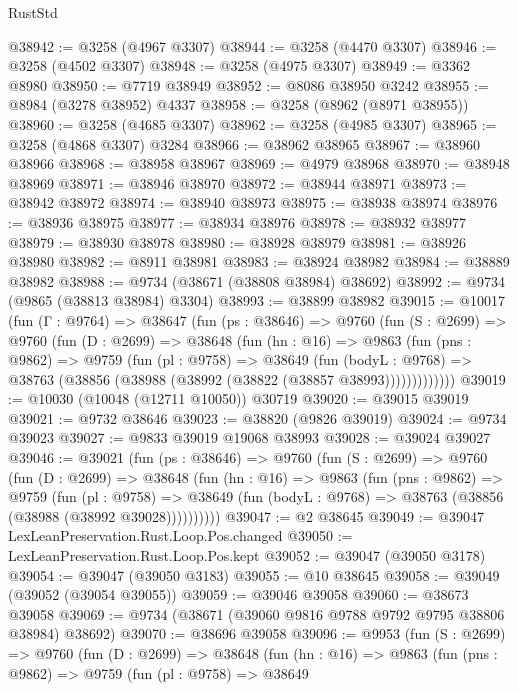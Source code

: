 \begin{lexlean}{RustStd}
\begin{coremodule}
@38942 := @3258 (@4967 @3307)
@38944 := @3258 (@4470 @3307)
@38946 := @3258 (@4502 @3307)
@38948 := @3258 (@4975 @3307)
@38949 := @3362 @8980
@38950 := @7719 @38949
@38952 := @8086 @38950 @3242
@38955 := @8984 (@3278 @38952) @4337
@38958 := @3258 (@8962 (@8971 @38955))
@38960 := @3258 (@4685 @3307)
@38962 := @3258 (@4985 @3307)
@38965 := @3258 (@4868 @3307) @3284
@38966 := @38962 @38965
@38967 := @38960 @38966
@38968 := @38958 @38967
@38969 := @4979 @38968
@38970 := @38948 @38969
@38971 := @38946 @38970
@38972 := @38944 @38971
@38973 := @38942 @38972
@38974 := @38940 @38973
@38975 := @38938 @38974
@38976 := @38936 @38975
@38977 := @38934 @38976
@38978 := @38932 @38977
@38979 := @38930 @38978
@38980 := @38928 @38979
@38981 := @38926 @38980
@38982 := @8911 @38981
@38983 := @38924 @38982
@38984 := @38889 @38982
@38988 := @9734 (@38671 (@38808 @38984) @38692)
@38992 := @9734 (@9865 (@38813 @38984) @3304)
@38993 := @38899 @38982
@39015 := @10017
    (fun (Γ : @9764) =>
    @38647
      (fun (ps : @38646) =>
      @9760
        (fun (S : @2699) =>
        @9760
          (fun (D : @2699) =>
          @38648
            (fun (hn : @16) =>
            @9863
              (fun (pns : @9862) =>
              @9759
                (fun (pl : @9758) =>
                @38649
                  (fun (bodyL : @9768) =>
                  @38763 (@38856 (@38988 (@38992 (@38822 (@38857 @38993)))))))))))))
@39019 := @10030 (@10048 (@12711 @10050)) @30719
@39020 := @39015 @39019
@39021 := @9732 @38646
@39023 := @38820 (@9826 @39019)
@39024 := @9734 @39023
@39027 := @9833 @39019 @19068 @38993
@39028 := @39024 @39027
@39046 := @39021
    (fun (ps : @38646) =>
    @9760
      (fun (S : @2699) =>
      @9760
        (fun (D : @2699) =>
        @38648
          (fun (hn : @16) =>
          @9863
            (fun (pns : @9862) =>
            @9759
              (fun (pl : @9758) =>
              @38649 (fun (bodyL : @9768) => @38763 (@38856 (@38988 (@38992 @39028))))))))))
@39047 := @2 @38645
@39049 := @39047 LexLeanPreservation.Rust.Loop.Pos.changed
@39050 := LexLeanPreservation.Rust.Loop.Pos.kept
@39052 := @39047 (@39050 @3178)
@39054 := @39047 (@39050 @3183)
@39055 := @10 @38645
@39058 := @39049 (@39052 (@39054 @39055))
@39059 := @39046 @39058
@39060 := @38673 @39058
@39069 := @9734 (@38671 (@39060 @9816 @9788 @9792 @9795 @38806 @38984) @38692)
@39070 := @38696 @39058
@39096 := @9953
    (fun (S : @2699) =>
    @9760
      (fun (D : @2699) =>
      @38648
        (fun (hn : @16) =>
        @9863
          (fun (pns : @9862) =>
          @9759
            (fun (pl : @9758) =>
            @38649

\end{coremodule}
\end{lexlean}
